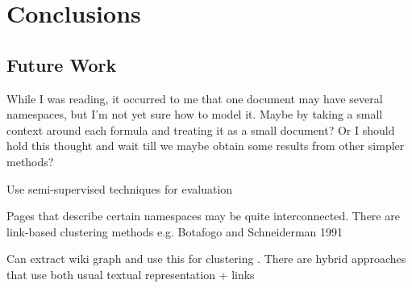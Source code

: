 \section{Conclusions}


\subsection{Future Work}


While I was reading, it occurred to me that one document may have several namespaces, but I'm not yet sure how to model it. Maybe by taking a small context around each formula and treating it as a small document? Or I should hold this thought and wait till we maybe obtain some results from other simpler methods?



Use semi-supervised techniques for evaluation



Pages that describe certain namespaces may be quite interconnected.
There are link-based clustering methods e.g. Botafogo and Schneiderman 1991

Can extract wiki graph and use this for clustering .
There are hybrid approaches that use both usual textual representation  + links
\cite{oikonomakou2005review}

